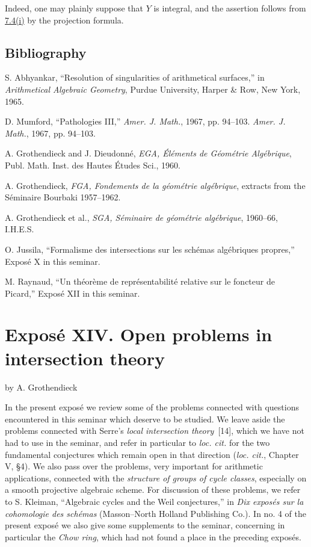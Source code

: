 Indeed, one may plainly suppose that $Y$ is integral, and the assertion follows from \hyperlink{sga6.e13.cor.7-4}{7.4(i)} by the projection formula.

\subsection*{Bibliography}
\begin{enumerate}[label={[\arabic*]}]
\item S. Abhyankar, ``Resolution of singularities of arithmetical surfaces,'' in \emph{Arithmetical Algebraic Geometry}, Purdue University, Harper \& Row, New York, 1965.
\item D. Mumford, ``Pathologies III,'' \emph{Amer. J. Math.}, 1967, pp. 94--103. \emph{Amer. J. Math.}, 1967, pp. 94--103.
\item A. Grothendieck and J. Dieudonn\'e, \emph{EGA, \'El\'ements de G\'eom\'etrie Alg\'ebrique}, Publ. Math. Inst. des Hautes \'Etudes Sci., 1960.
\item A. Grothendieck, \emph{FGA, Fondements de la g\'eom\'etrie alg\'ebrique}, extracts from the S\'eminaire Bourbaki 1957--1962.
\item A. Grothendieck et al., \emph{SGA, S\'eminaire de g\'eom\'etrie alg\'ebrique}, 1960--66, I.H.E.S.
\item O. Jussila, ``Formalisme des intersections sur les sch\'emas alg\'ebriques propres,'' Expos\'e X in this seminar.
\item M. Raynaud, ``Un th\'eor\`eme de repr\'esentabilit\'e relative sur le foncteur de Picard,'' Expos\'e XII in this seminar.
\end{enumerate}

\section*{Expos\'e XIV. Open problems in intersection theory}
\begin{center}
by A. Grothendieck
\end{center}

In the present expos\'e we review some of the problems connected with questions encountered in this seminar which deserve to be studied. We leave aside the problems connected with Serre's \emph{local intersection theory}~[14], which we have not had to use in the seminar, and refer in particular to \emph{loc. cit.} for the two fundamental conjectures which remain open in that direction (\emph{loc. cit.}, Chapter V, \S4). We also pass over the problems, very important for arithmetic applications, connected with the \emph{structure of groups of cycle classes}, especially on a smooth projective algebraic scheme. For discussion of these problems, we refer to S. Kleiman, ``Algebraic cycles and the Weil conjectures,'' in \emph{Dix expos\'es sur la cohomologie des sch\'emas} (Masson--North Holland Publishing Co.). In no. 4 of the present expos\'e we also give some supplements to the seminar, concerning in particular the \emph{Chow ring}, which had not found a place in the preceding expos\'es.

